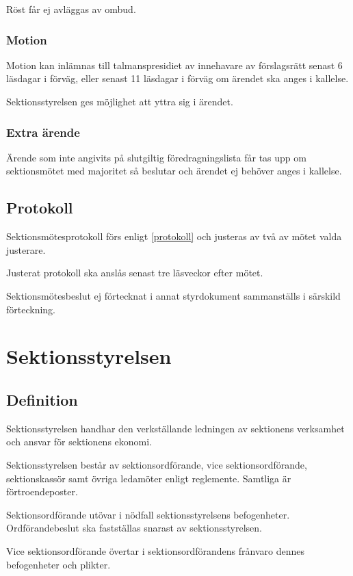 \documentclass{styrdokument}
\begin{document}
\? Röst får ej avläggas av ombud.

\subsubsection{Motion}
\? Motion kan inlämnas till talmanspresidiet av innehavare av förslagsrätt senast 6 läsdagar i förväg, eller senast 11 läsdagar i förväg om ärendet ska anges i kallelse.

\? Sektionsstyrelsen ges möjlighet att yttra sig i ärendet.

\subsubsection{Extra ärende}
\? Ärende som inte angivits på slutgiltig föredragningslista får tas upp om sektionsmötet med  majoritet så beslutar och ärendet ej behöver anges i kallelse.
\label{beslut.extraarende}
  
\subsection{Protokoll}
\? Sektionsmötesprotokoll förs enligt \cref{protokoll} och justeras av två av mötet valda justerare.

\? Justerat protokoll ska anslås senast tre läsveckor efter mötet.

\? Sektionsmötesbeslut ej förtecknat i annat styrdokument sammanställs i särskild förteckning.

\section{Sektionsstyrelsen}
\subsection{Definition}

\? Sektionsstyrelsen handhar den verkställande ledningen av sektionens verksamhet och ansvar för sektionens ekonomi.

\? Sektionsstyrelsen består av sektionsordförande, vice sektionsordförande, sektionskassör samt övriga ledamöter enligt reglemente.
Samtliga är förtroendeposter.

\? Sektionsordförande utövar i nödfall sektionsstyrelsens befogenheter.
Ordförandebeslut ska fastställas snarast av sektionsstyrelsen.

\? Vice sektionsordförande övertar i sektionsordförandens frånvaro dennes befogenheter och plikter.
\end{document}
